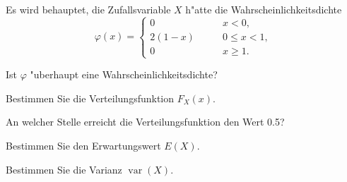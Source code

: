 Es wird behauptet, die Zufallsvariable $X$ h"atte die
Wahrscheinlichkeitsdichte
\[
\varphi(x)=\begin{cases}
     0&\qquad x < 0,\\
2(1-x)&\qquad 0\le x < 1,\\
     0&\qquad x \ge 1.
\end{cases}
\]
\begin{teilaufgaben}
\item Ist $\varphi$ "uberhaupt eine Wahrscheinlichkeitsdichte?
\item Bestimmen Sie die Verteilungsfunktion $F_X(x)$.
\item An welcher Stelle erreicht die Verteilungsfunktion den Wert 0.5?
\item Bestimmen Sie den Erwartungswert $E(X)$.
\item Bestimmen Sie die Varianz $\operatorname{var}(X)$.
\end{teilaufgaben}

